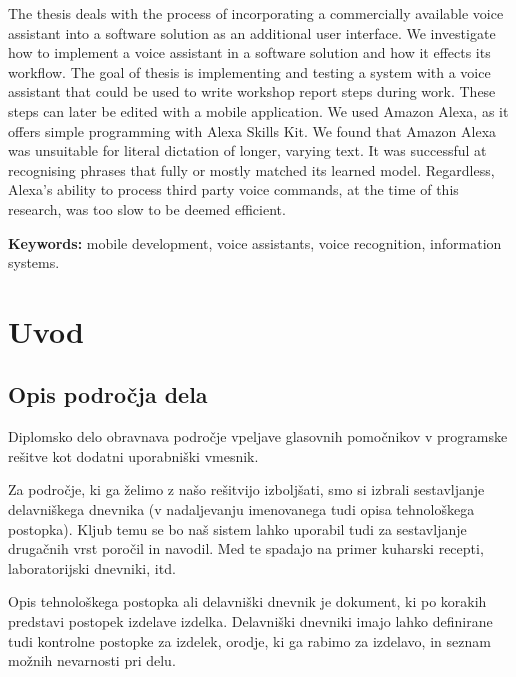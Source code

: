 \documentclass[a4paper, 12pt]{book}
\newcommand{\tkeywordsEn}{mobile development, voice assistants, voice recognition, information systems}
\newcommand{\clearemptydoublepage}{\newpage{\pagestyle{empty}\cleardoublepage}}
\begin{document}
\noindent The thesis deals with the process of incorporating a commercially available voice assistant into a software solution as an additional user interface.
We investigate how to implement a voice assistant in a software solution and how it effects its workflow.
The goal of thesis is implementing and testing a system with a voice assistant that could be used to write workshop report steps during work.
These steps can later be edited with a mobile application.
We used Amazon Alexa, as it offers simple programming with Alexa Skills Kit.
We found that Amazon Alexa was unsuitable for literal dictation of longer, varying text.
It was successful at recognising phrases that fully or mostly matched its learned model.
Regardless, Alexa's ability to process third party voice commands, at the time of this research, was too slow to be deemed efficient.

\bigskip

\noindent\textbf{Keywords:} \tkeywordsEn.
\clearemptydoublepage

\mainmatter
\setcounter{page}{1}
\pagestyle{fancy}

\chapter{Uvod}
\section{Opis področja dela}

Diplomsko delo obravnava področje vpeljave glasovnih pomočnikov v programske rešitve kot dodatni uporabniški vmesnik.

Za področje, ki ga želimo z našo rešitvijo  izboljšati, smo si izbrali sestavljanje delavniškega dnevnika (v nadaljevanju imenovanega tudi opisa tehnološkega postopka).
Kljub temu se bo naš sistem lahko uporabil tudi za sestavljanje drugačnih vrst poročil in navodil.
Med te spadajo na primer kuharski recepti, laboratorijski dnevniki, itd.

Opis tehnološkega postopka ali delavniški dnevnik je dokument, ki po korakih predstavi postopek izdelave izdelka.
Delavniški dnevniki imajo lahko definirane tudi kontrolne postopke za izdelek, orodje, ki ga rabimo za izdelavo, in seznam možnih nevarnosti pri delu.
\end{document}
